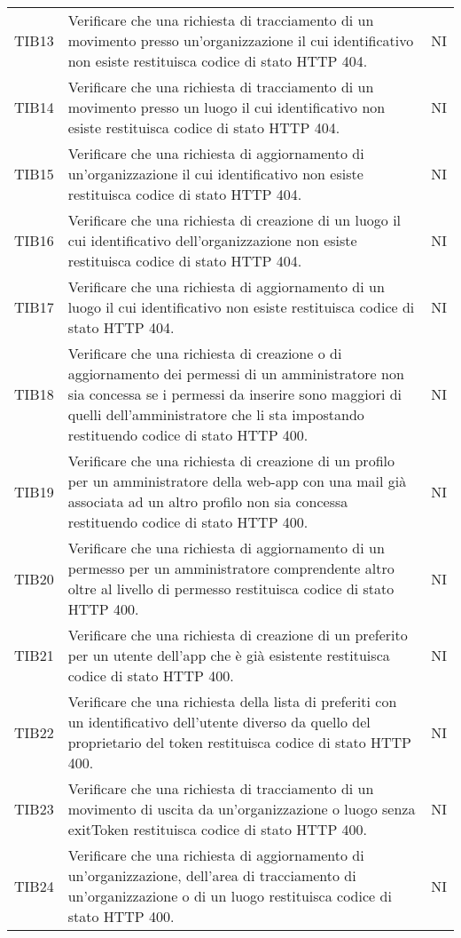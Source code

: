 {\begin{longtable}{ c C{13cm} C{1cm}}
TIB13 & Verificare che una richiesta di tracciamento di un movimento presso un'organizzazione il cui identificativo non esiste restituisca codice di stato HTTP 404. & NI \\
TIB14 & Verificare che una richiesta di tracciamento di un movimento presso un luogo il cui identificativo non esiste restituisca codice di stato HTTP 404. & NI \\
TIB15 & Verificare che una richiesta di aggiornamento di un'organizzazione il cui identificativo non esiste restituisca codice di stato HTTP 404. & NI \\
TIB16 & Verificare che una richiesta di creazione di un luogo il cui identificativo dell'organizzazione non esiste restituisca codice di stato HTTP 404. & NI \\
TIB17 & Verificare che una richiesta di aggiornamento di un luogo il cui identificativo non esiste restituisca codice di stato HTTP 404. & NI \\
TIB18 & Verificare che una richiesta di creazione o di aggiornamento dei permessi di un amministratore non sia concessa se i permessi da inserire sono maggiori di quelli dell'amministratore che li sta impostando restituendo codice di stato HTTP 400. & NI \\
TIB19 & Verificare che una richiesta di creazione di un profilo per un amministratore della web-app con una mail già associata ad un altro profilo non sia concessa restituendo codice di stato HTTP 400. & NI \\
TIB20 & Verificare che una richiesta di aggiornamento di un permesso per un amministratore comprendente altro oltre al livello di permesso restituisca codice di stato HTTP 400. & NI \\
TIB21 & Verificare che una richiesta di creazione di un preferito per un utente dell'app che è già esistente restituisca codice di stato HTTP 400. & NI \\
TIB22 & Verificare che una richiesta della lista di preferiti con un identificativo dell'utente diverso da quello del proprietario del token restituisca codice di stato HTTP 400. & NI \\
TIB23 & Verificare che una richiesta di tracciamento di un movimento di uscita da un'organizzazione o luogo senza exitToken restituisca codice di stato HTTP 400. & NI \\
TIB24 & Verificare che una richiesta di aggiornamento di un'organizzazione, dell'area di tracciamento di un'organizzazione o di un luogo restituisca codice di stato HTTP 400. & NI \\

\end{longtable}}
